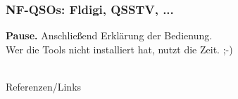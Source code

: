 \begin{frame}
    \frametitle{NF-QSOs: Fldigi, QSSTV, ...}

    \Large \textbf{Pause.}
    \normalsize Anschließend Erklärung der Bedienung. \\[2em]


    Wer die Tools nicht installiert hat, nutzt die Zeit. ;-)


\end{frame}

\renewcommand{\refname}{Referenzen}

\hypertarget{refs}{}
\textcolor{white}{} \\ %
\Large Referenzen/Links
\footnotesize

